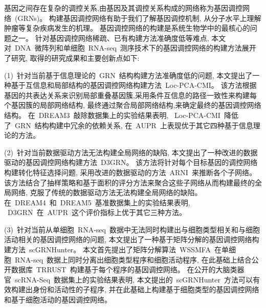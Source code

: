 \begin{abstractcn}\setlength{\baselineskip}{20pt}%

基因之间存在复杂的调控关系,由基因及其调控关系构成的网络称为基因调控网络~(GRNs)。
构建基因调控网络有助于我们了解基因调控机制,
从分子水平上理解肿瘤等复杂疾病发生的机理。
基因调控网络的构建是系统生物学中的最核心的问题之一。
针对基因调控网络稀疏、已有构建方法准确度低等难点, 
本文对~DNA~微阵列和单细胞~RNA-seq~测序技术下的基因调控网络的构建方法展开了研究,
取得的研究成果和主要创新点如下:

(1)~针对当前基于信息理论的~GRN~结构构建方法准确度低的问题,
本文提出了一种基于互信息和局部结构的基因调控网络构建方法~Loc-PCA-CMI。
该方法根据基因的共表达关系来识别局部重叠基因簇,采用条件互信息的路径一致性来构建每个基因簇的局部网络结构,
最终通过聚合局部网络结构,来确定最终的基因调控网络结构。
在~DREAM3~敲除数据集上的实验结果表明,
~Loc-PCA-CMI~降低了~GRN~结构构建中冗余的依赖关系,
在~AUPR~上表现优于其它四种基于信息理论的方法。

(2)~针对当前数据驱动方法无法构建全局网络的缺陷,
本文提出了一种改进的数据驱动的基因调控网络构建方法~D3GRN。
该方法将针对每个目标基因的调控网络构建转化特征选择问题,
采用改进的数据驱动的方法~ARNI~来推断各个子网络。
该方法结合了抽样策略和基于面积的评分方法来聚合这些子网络从而构建最终的全局网络,
克服了传统的数据驱动方法无法构建全局网络的缺陷。
在~DREAM4~和~DREAM5~基准数据集上的实验结果表明,
~D3GRN~在~AUPR~这个评价指标上优于其它三种方法。


(3)~针对当前从单细胞~RNA-seq~数据中无法同时构建出与细胞类型相关和与细胞活动相关的基因调控网络的问题,
本文提出了一种基于矩阵分解的基因调控网络构建方法~scGRNHunter。
本文首先提出了矩阵分解算法~WSSMFA~在单细胞~RNA-seq~数据上同时分离出细胞类型程序和细胞活动程序,
在此基础上结合公开数据库~TRRUST~构建基于每个程序的基因调控网络。
在公开的大脑类器官~scRNA-Seq~数据集上的实验结果表明,
本文提出的~scGRNHunter~方法可以有效构建出身份和活动性的子程序, 
并在此基础上构建基于细胞类型的基因调控网络和基于细胞活动的基因调控网络。



\end{abstractcn}
